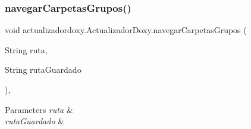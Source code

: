 \subsubsection{\texorpdfstring{navegar\+Carpetas\+Grupos()}{navegarCarpetasGrupos()}}
{\footnotesize\ttfamily void actualizadordoxy.\+Actualizador\+Doxy.\+navegar\+Carpetas\+Grupos (\begin{DoxyParamCaption}\item[{String}]{ruta,  }\item[{String}]{ruta\+Guardado }\end{DoxyParamCaption})\hspace{0.3cm}{\ttfamily [inline]}, {\ttfamily [private]}}


\begin{DoxyParams}{Parameters}
{\em ruta} & \\
\hline
{\em ruta\+Guardado} & \\
\hline
\end{DoxyParams}

